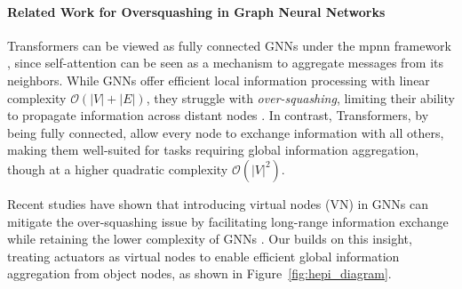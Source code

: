 

\paragraph{Related Work for Oversquashing in Graph Neural Networks}

Transformers \citep{attention} can be viewed as fully connected GNNs under the \gls{mpnn} framework \citep{battaglia2018relational}, since self-attention can be seen as a mechanism to aggregate messages from its neighbors. While GNNs offer efficient local information processing with linear complexity $\mathcal{O}(|V| + |E|)$, they struggle with \emph{over-squashing}, limiting their ability to propagate information across distant nodes \citep{oversquashing}. In contrast, Transformers, by being fully connected, allow every node to exchange information with all others, making them well-suited for tasks requiring global information aggregation, though at a higher quadratic complexity $\mathcal{O}(|V|^2)$.

Recent studies have shown that introducing virtual nodes (VN) in GNNs can mitigate the over-squashing issue by facilitating long-range information exchange while retaining the lower complexity of GNNs \citep{oversquashing, pmlr-v202-cai23b, rosenbluth2024distinguished}. Our \model builds on this insight, treating actuators as virtual nodes to enable efficient global information aggregation from object nodes, as shown in Figure~\ref{fig:hepi_diagram}.


